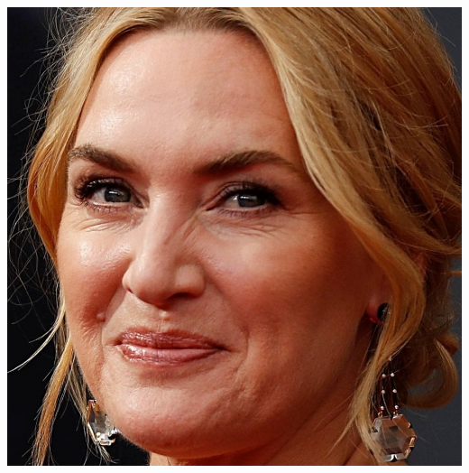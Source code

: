 \documentclass{article}
\begin{document}
\begin{center}
\begin{multicols}{3}
\includegraphics[scale=0.25]{images/Kate_Winslet.jpg}
\end{multicols}
\end{center}    
\end{document}
